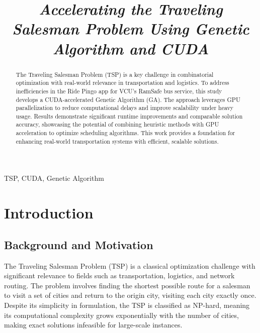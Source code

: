 \documentclass[conference]{IEEEtran}
\begin{document}
\title{\textit{Accelerating the Traveling Salesman Problem Using Genetic Algorithm and CUDA}\\
}

\author{

}

\maketitle
\begin{abstract}
The Traveling Salesman Problem (TSP) is a key challenge in combinatorial optimization with real-world relevance in transportation and logistics. To address inefficiencies in the Ride Pingo app for VCU’s RamSafe bus service, this study develops a CUDA-accelerated Genetic Algorithm (GA). The approach leverages GPU parallelization to reduce computational delays and improve scalability under heavy usage. Results demonstrate significant runtime improvements and comparable solution accuracy, showcasing the potential of combining heuristic methods with GPU acceleration to optimize scheduling algorithms. This work provides a foundation for enhancing real-world transportation systems with efficient, scalable solutions.
\end{abstract}

\begin{IEEEkeywords}
TSP, CUDA, Genetic Algorithm
\end{IEEEkeywords}

\section{Introduction}

\subsection{Background and Motivation}

The Traveling Salesman Problem (TSP) is a classical optimization challenge with significant relevance to fields such as transportation, logistics, and network routing. The problem involves finding the shortest possible route for a salesman to visit a set of cities and return to the origin city, visiting each city exactly once. Despite its simplicity in formulation, the TSP is classified as NP-hard, meaning its computational complexity grows exponentially with the number of cities, making exact solutions infeasible for large-scale instances.
\end{document}
